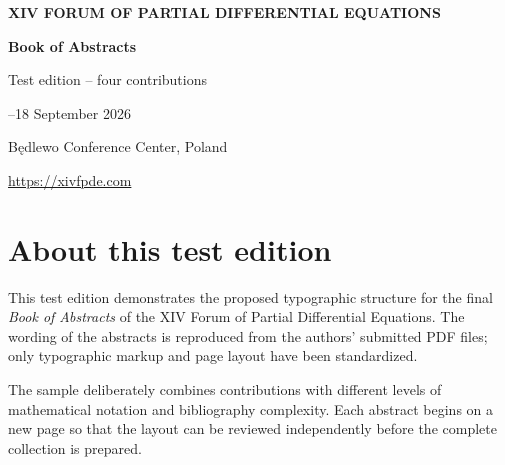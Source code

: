 \documentclass[11pt,a4paper,oneside]{book}
\begin{document}
\hypersetup{pageanchor=false}
\begin{titlepage}
  \thispagestyle{empty}
  \centering
  \vspace*{18mm}
  {\sffamily\bfseries\color{ForumNavy}\fontsize{16}{20}\selectfont
    XIV FORUM OF PARTIAL DIFFERENTIAL EQUATIONS\par}
  \vspace{18mm}
  {\sffamily\bfseries\color{ForumNavy}\fontsize{34}{40}\selectfont
    Book of Abstracts\par}
  \vspace{5mm}
  {\sffamily\color{ForumBlue}\fontsize{15}{19}\selectfont
    Test edition -- four contributions\par}
  \vfill
  {\fontsize{13}{17}--18 September 2026\par
    Będlewo Conference Center, Poland\par}
  \vspace{14mm}
  {\sffamily\small\color{ForumGray}
    \url{https://xivfpde.com}\par}
  \vspace{12mm}
\end{titlepage}
\hypersetup{pageanchor=true}

\frontmatter

\chapter*{About this test edition}

This test edition demonstrates the proposed typographic structure for the final
\emph{Book of Abstracts} of the XIV Forum of Partial Differential Equations.
The wording of the abstracts is reproduced from the authors' submitted PDF files;
only typographic markup and page layout have been standardized.

The sample deliberately combines contributions with different levels of
mathematical notation and bibliography complexity. Each abstract begins on a
new page so that the layout can be reviewed independently before the complete
collection is prepared.

\tableofcontents

\mainmatter





\end{document}
